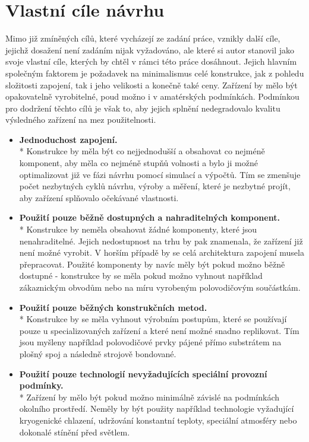 \section{Vlastní cíle návrhu}
Mimo již zmíněných cílů, které vycházejí ze zadání práce, vznikly další cíle, jejichž dosažení není zadáním nijak vyžadováno, ale které si autor stanovil jako svoje vlastní cíle, kterých by chtěl v rámci této práce dosáhnout. Jejich hlavním společným faktorem je požadavek na minimalismus celé konstrukce, jak z pohledu složitosti zapojení, tak i jeho velikosti a konečně také ceny. Zařízení by mělo být opakovatelně vyrobitelné, poud možno i v amatérských podmínkách. Podmínkou pro dodržení těchto cílů je však to, aby jejich splnění nedegradovalo kvalitu výsledného zařízení na mez použitelnosti.
\begin{itemize}
\item \textbf{Jednoduchost zapojení.}\\*
Konstrukce by měla být co nejjednodušší a obsahovat co nejméně komponent, aby měla co nejméně stupňů volnosti a bylo ji možné optimalizovat již ve fázi návrhu pomocí simulací a výpočtů. Tím se zmenšuje počet nezbytných cyklů návrhu, výroby a měření, které je nezbytné projít, aby zařízení splňovalo očekávané vlastnosti.
\item \textbf{Použití pouze běžně dostupných a nahraditelných komponent.}\\*
Konstrukce by neměla obsahovat žádné komponenty, které jsou nenahraditelné. Jejich nedostupnost na trhu by pak znamenala, že zařízení již není možné vyrobit. V horším případě by se celá architektura zapojení musela přepracovat. Použité komponenty by navíc měly být pokud možno běžně dostupné - konstrukce by se měla pokud možno vyhnout například zákaznickým obvodům nebo na míru vyrobeným polovodičovým součástkám.
\item \textbf{Použití pouze běžných konstrukčních metod.}\\*
Konstrukce by se měla vyhnout výrobním postupům, které se používají pouze u specializovaných zařízení a které není možné snadno replikovat. Tím jsou myšleny například polovodičové prvky pájené přímo substrátem na plošný spoj a následně strojově bondované.
\item \textbf{Použití pouze technologií nevyžadujících speciální provozní podmínky.}\\*
Zařízení by mělo být pokud možno minimálně závislé na podmínkách okolního prostředí. Neměly by být použity například technologie vyžadující kryogenické chlazení, udržování konstantní teploty, speciální atmosféry nebo dokonalé stínění před světlem.

\end{itemize}
